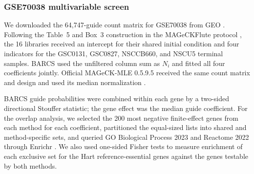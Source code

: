 \subsubsection{GSE70038 multivariable screen}

We downloaded the 64,747-guide count matrix for GSE70038 from GEO
\citep{toledo2015pkmyt1}.  Following the Table~5 and Box~3 construction in the
MAGeCKFlute protocol \citep{wang2019mageckflute}, the 16 libraries received an
intercept for their shared initial condition and four indicators for the
GSC0131, GSC0827, NSCCB660, and NSCU5 terminal samples.  BARCS used the
unfiltered column sum as $N_i$ and fitted all four coefficients jointly.
Official MAGeCK-MLE 0.5.9.5 received the same count matrix and design and used
its median normalization \citep{li2014mageck}.

BARCS guide probabilities were combined within each gene by a two-sided
directional Stouffer statistic; the gene effect was the median guide
coefficient.  For the overlap analysis, we selected the 200 most negative
finite-effect genes from each method for each coefficient, partitioned the
equal-sized lists into shared and method-specific sets, and queried GO
Biological Process 2023 and Reactome 2022 through Enrichr
\citep{chen2013enrichr}.  We also used one-sided Fisher tests to measure
enrichment of each exclusive set for the Hart reference-essential genes
\citep{hart2017evaluation} against the genes testable by both methods.
